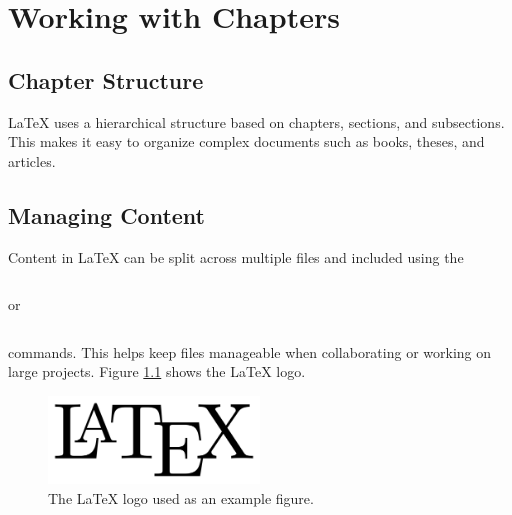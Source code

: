 \chapter{Working with Chapters}
\section{Chapter Structure}
LaTeX uses a hierarchical structure based on chapters, sections, and subsections. This makes it easy to organize complex documents such as books, theses, and articles.
\section{Managing Content}
Content in LaTeX can be split across multiple files and included using the
\begin{verbatim}

\end{verbatim}
or
\begin{verbatim}

\end{verbatim}
commands. This helps keep files manageable when collaborating or working on large projects. Figure
\ref{fig:latex-logo}
shows the LaTeX logo.
\begin{figure}[h]
\centering
\includegraphics[width=0.5\textwidth]{figs/logo.png}
\caption{The LaTeX logo used as an example figure.}
\label{fig:latex-logo}
\end{figure}
